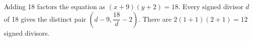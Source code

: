 Adding 18 factors the equation as $(x+9)(y+2)=18$. Every signed divisor $d$ of 18 gives the distinct pair $(d-9,\dfrac{18}{d}-2)$. There are $2(1+1)(2+1)=\boxed{12}$ signed divisors.
